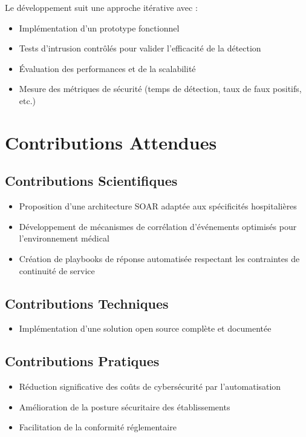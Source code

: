 Le développement suit une approche itérative avec :
\begin{itemize}
    \item Implémentation d'un prototype fonctionnel
    \item Tests d'intrusion contrôlés pour valider l'efficacité de la détection
    \item Évaluation des performances et de la scalabilité
    \item Mesure des métriques de sécurité (temps de détection, taux de faux positifs, etc.)
\end{itemize}

\section{Contributions Attendues}

\subsection{Contributions Scientifiques}

\begin{itemize}
    \item Proposition d'une architecture SOAR adaptée aux spécificités hospitalières
    \item Développement de mécanismes de corrélation d'événements optimisés pour l'environnement médical
    \item Création de playbooks de réponse automatisée respectant les contraintes de continuité de service
\end{itemize}

\subsection{Contributions Techniques}

\begin{itemize}
    \item Implémentation d'une solution open source complète et documentée
\end{itemize}

\subsection{Contributions Pratiques}

\begin{itemize}
    \item Réduction significative des coûts de cybersécurité par l'automatisation
    \item Amélioration de la posture sécuritaire des établissements
    \item Facilitation de la conformité réglementaire
\end{itemize}

